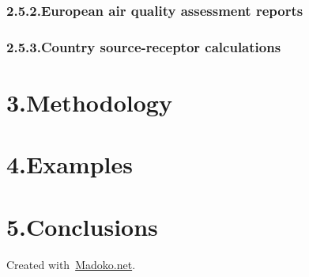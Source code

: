 \documentclass[9pt]{report}
\begin{document}
\subsubsection{2.5.2.\hspace*{0.5em}European air quality assessment reports}\label{sec-european-air-quality-assessment-reports}%

\subsubsection{2.5.3.\hspace*{0.5em}Country source-receptor calculations}\label{sec-country-source-receptor-calculations}%

\section{3.\hspace*{0.5em}Methodology}\label{sec-methodology}%

\section{4.\hspace*{0.5em}Examples}\label{sec-examples}%

\section{5.\hspace*{0.5em}Conclusions}\label{sec-conclusions}%

\begin{mdbmargintb}{4em}{}%
\begin{mdflushright}%
{\tiny{}Created with~\href{https://www.madoko.net}{Madoko.net}.}%
\end{mdflushright}%
\end{mdbmargintb}%
\end{document}
